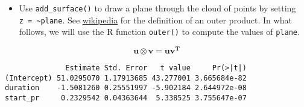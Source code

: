 \documentclass[
]{book}
\newenvironment{Shaded}{\begin{snugshade}}{\end{snugshade}}
\newcommand{\CommentTok}[1]{\textcolor[rgb]{0.56,0.35,0.01}{\textit{#1}}}
\newcommand{\DataTypeTok}[1]{\textcolor[rgb]{0.13,0.29,0.53}{#1}}
\newcommand{\FloatTok}[1]{\textcolor[rgb]{0.00,0.00,0.81}{#1}}
\newcommand{\KeywordTok}[1]{\textcolor[rgb]{0.13,0.29,0.53}{\textbf{#1}}}
\newcommand{\NormalTok}[1]{#1}
\newcommand{\OperatorTok}[1]{\textcolor[rgb]{0.81,0.36,0.00}{\textbf{#1}}}
\newcommand{\StringTok}[1]{\textcolor[rgb]{0.31,0.60,0.02}{#1}}
\providecommand{\tightlist}{%
  \setlength{\itemsep}{0pt}\setlength{\parskip}{0pt}}
\begin{document}
\begin{Shaded}
\end{Shaded}

\begin{itemize}
\tightlist
\item
  Use \texttt{add\_surface()} to draw a plane through the cloud of points by setting \texttt{z\ =\ \textasciitilde{}plane}. See \href{https://en.wikipedia.org/wiki/Outer_product}{wikipedia} for the definition of an outer product. In what follows, we will use the R function \texttt{outer()} to compute the values of \texttt{plane}.
\end{itemize}

\[\mathbf{u \otimes v} = \mathbf{uv^T}\]

\begin{Shaded}
\end{Shaded}

\begin{verbatim}
              Estimate Std. Error   t value     Pr(>|t|)
(Intercept) 51.0295070 1.17913685 43.277001 3.665684e-82
duration    -1.5081260 0.25551997 -5.902184 2.644972e-08
start_pr     0.2329542 0.04363644  5.338525 3.755647e-07
\end{verbatim}
\end{document}
